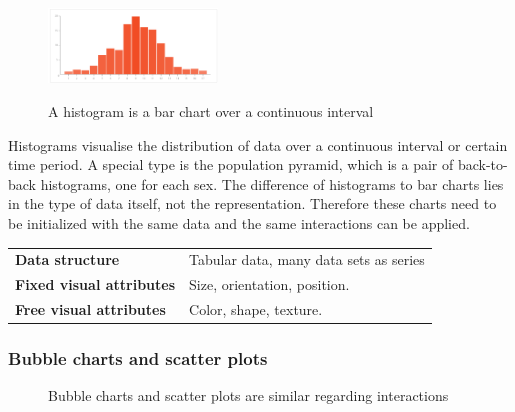 \documentclass{article}
\newcommand{\conceptTable}[3]{%
    \begin{center}
    {\small
        \begin{tabulary}{\textwidth}{ll}
            \bf Data structure & #1 \\

            \bf Fixed visual attributes & #2 \\

            \bf Free visual attributes & #3  \\
        \end{tabulary}
    }
    \end{center}
}
\begin{document}
\begin{figure}
  \centering
    \includegraphics[width=0.4\textwidth]{images/chartTypes/histogram.png}%
    \label{fig:concept:chart-types:histograms}
    \caption{A histogram is a bar chart over a continuous interval}%
\end{figure}

Histograms visualise the distribution of data over a continuous interval or certain time period.
A special type is the population pyramid, which is a pair of back-to-back histograms, one for each sex.
The difference of histograms to bar charts lies in the type of data itself, not the representation.
Therefore these charts need to be initialized with the same data and the same interactions can be applied.

\conceptTable{Tabular data, many data sets as series}{Size, orientation, position.}{Color, shape, texture.}

\subsubsection{Bubble charts and scatter plots}

\begin{figure}
  \centering
    \qquad
    \caption{Bubble charts and scatter plots are similar regarding interactions}%
    \label{fig:concept:chart-types:bubble-chart}
\end{figure}
\end{document}
